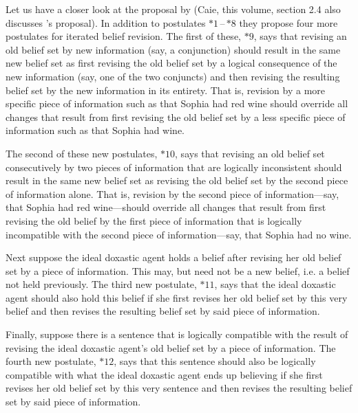 Let us have a closer look at the proposal by \citet{dp97} (Caie, this volume, section 2.4 also discusses \citealt{b96}'s proposal). In addition to postulates $*1$\,--\,$*8$ they propose four more postulates for iterated belief revision. The first of these, $*9$, says that revising an old belief set by new information (say, a conjunction) should result in the same new belief set as first revising the old belief set by a logical consequence of the new information (say, one of the two conjuncts) and then revising the resulting belief set by the new information in its entirety. That is, revision by a more specific piece of information such as that Sophia had red wine should override all changes that result from first revising the old belief set by a less specific piece of information such as that Sophia had wine.

The second of these new postulates, $*10$, says that revising an old belief set consecutively by two pieces of information that are logically inconsistent should result in the same new belief set as revising the old belief set by the second piece of information alone. That is, revision by the second piece of information---say, that Sophia had red wine---should override all changes that result from first revising the old belief by the first piece of information that is logically incompatible with the second piece of information---say, that Sophia had no wine.

Next suppose the ideal doxastic agent holds a belief after revising her old belief set by a piece of information. This may, but need not be a new belief, i.e. a belief not held previously. The third new postulate, $*11$, says that the ideal doxastic agent should also hold this belief if she first revises her old belief set by this very belief and then revises the resulting belief set by said piece of information.

Finally, suppose there is a sentence that is logically compatible with the result of revising the ideal doxastic agent's old belief set by a piece of information. The fourth new postulate, $*12$, says that this sentence should also be logically compatible with what the ideal doxastic agent ends up believing if she first revises her old belief set by this very sentence and then revises the resulting belief set by said piece of information.

